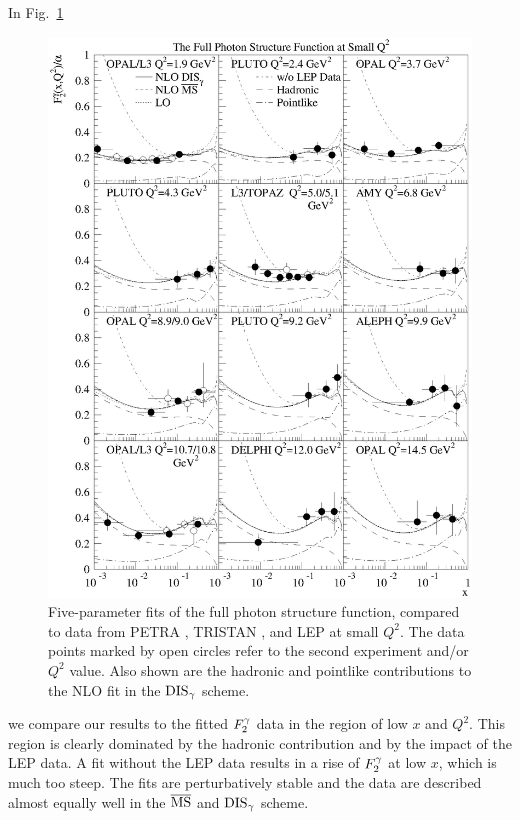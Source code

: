 \documentclass[aps,prl,twocolumn,groupedaddress]{revtex4}
\begin{document}
In Fig.\ \ref{fig:2}
%
\begin{figure}
 \centering
 \includegraphics[width=0.9\columnwidth]{fig2}
 \caption{\label{fig:2}Five-parameter fits of the full photon structure
 function, compared to data from PETRA \cite{Berger:1984xt}, TRISTAN
 \cite{Kojima:1997wg,Muramatsu:1994rq}, and LEP \cite{Barate:1999qy,
 Abreu:1996xt,Acciarri:1998ig,%
 Ackerstaff:1997ni,
 Abbiendi:2000cw} at small $Q^2$. The data points marked by open
 circles refer to the second experiment and/or $Q^2$ value. Also shown are the
 hadronic and pointlike contributions to the NLO fit in the ${\rm DIS}_\gamma$ scheme.}
\end{figure}
%
we compare our results to the fitted $\f2y$ data in the region of low $x$
and $Q^2$. This region is clearly dominated by the hadronic contribution
and by the impact of the LEP data. A fit without the LEP data results in a rise
of $\f2y$ at low $x$, which is much too steep. The fits are perturbatively
stable and the data are described almost equally well in the $\overline{\rm MS}$ and ${\rm DIS}_\gamma$
scheme.
\end{document}
